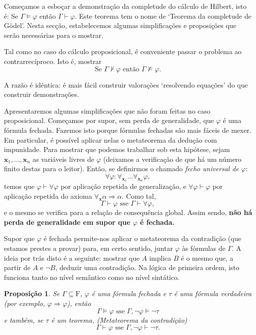 \documentclass{report}
\newtheorem{prop}{Proposição}
\theoremstyle{definition}
\theoremstyle{remark}
\renewcommand{\bf}[1]{\mathbf{#1}}
\newcommand{\F}{\mathrm{F}}
\newcommand{\imply}{\mathbin{\Rightarrow}}
\begin{document}
	Começamos a esboçar a demonstração da completude do cálculo de Hilbert, isto é: Se $\Gamma \vDash \varphi$ então $\Gamma \vdash \varphi$. Este teorema tem o nome de `Teorema da completude de Gödel'. Nesta secção, estabelecemos algumas simplificações e proposições que serão necessárias para o mostrar.
	
	Tal como no caso do cálculo proposicional, é conveniente passar o problema ao contrarrecíproco. Isto é, mostrar
	\[\text{Se } \Gamma \nvdash \varphi \text{ então } \Gamma \nvDash \varphi.\]
	
	A razão é idêntica: é mais fácil construir valorações `resolvendo equações' do que construir demonstrações.
	
	Apresentaremos algumas simplificações que não foram feitas no caso proposicional. Começamos por supor, sem perda de generalidade, que $\varphi$ é uma fórmula fechada. Fazemos isto porque fórmulas fechadas são mais fáceis de mexer. Em particular, é possível aplicar nelas o metateorema da dedução com impunidade. Para mostrar que podemos trabalhar sob esta hipótese, sejam $\bf x_1, \dots, \bf x_n$ as variáveis livres de $\varphi$ (deixamos a verificação de que há um número finito destas para o leitor). Então, se definirmos o chamado \emph{fecho universal de $\varphi$}:
	\[\forall \varphi : \forall_{\bf x_1} \dots \forall_{\bf x_n} \varphi,\]
	temos que $\varphi \vdash \forall \varphi$ por aplicação repetida de generalização, e $\forall \varphi \vdash \varphi$ por aplicação repetida do axioma $\forall_{\bf x} \alpha \imply \alpha$. Como tal,
	\[\Gamma \vdash \varphi \text{ sse } \Gamma \vdash \forall \varphi,\]
	e o mesmo se verifica para a relação de consequência global. Assim sendo, \textbf{não há perda de generalidade em supor que $\varphi$ é fechada.}
	
	Supor que $\varphi$ é fechada permite-nos aplicar o metateorema da contradição (que estamos prestes a provar) para, em certo sentido, juntar $\varphi$ às fórmulas de $\Gamma$. A ideia por trás disto é a seguinte: mostrar que $A$ implica $B$ é o mesmo que, a partir de $A$ e $\neg B$, deduzir uma contradição. Na lógica de primeira ordem, isto funciona tanto no nível semântico como no nível sintático.
	
	\begin{prop}\label{fol:mtc}
	Se $\Gamma \subseteq \F$, $\varphi$ é uma fórmula fechada e $\tau$ é uma fórmula verdadeira (por exemplo, $\varphi \imply \varphi$), então
	\[\Gamma \vDash \varphi \text{ sse } \Gamma, \neg \varphi \vDash \neg \tau\]
	e também, se $\tau$ é um teorema, (Metateorema da contradição)
	\[\Gamma \vdash \varphi \text{ sse } \Gamma, \neg \varphi \vdash \neg \tau.\]
	\end{prop}
	
\end{document}
